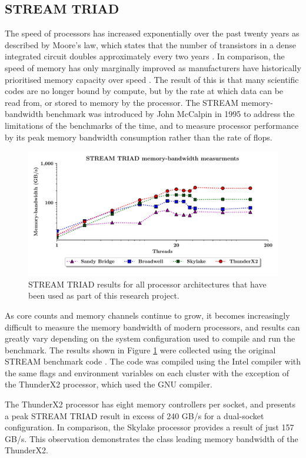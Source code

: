 \documentclass[a4paper,11pt]{report}
\begin{document}
\subsection{STREAM TRIAD}
The speed of processors has increased exponentially over the past twenty years as described by Moore's law, which states that the number of transistors in a dense integrated circuit doubles approximately every two years  \cite{moore1965cramming}. In comparison, the speed of memory has only marginally improved as manufacturers have historically prioritised memory capacity over speed \cite{mccalpin1995memory,patterson1997case}. The result of this is that many scientific codes are no longer bound by compute, but by the rate at which data can be read from, or stored to memory by the processor. The STREAM memory-bandwidth benchmark was introduced by John McCalpin in 1995 to address the limitations of the benchmarks of the time, and to measure processor performance by its peak memory bandwidth consumption rather than the rate of \gls{flops}.
\begin{figure}[htbp]
\begin{center}
\includegraphics[width=1\textwidth]{img/stream-triad.pdf}
\caption[STREAM TRIAD benchmark]{STREAM TRIAD results for all processor architectures that have been used as part of this research project. }
\label{fig:bandwidth}
\end{center}
\end{figure}
\par 
As core counts and memory channels continue to grow, it becomes increasingly difficult to measure the memory bandwidth of modern processors, and results can greatly vary depending on the system configuration used to compile and run the benchmark. The results shown in Figure \ref{fig:bandwidth} were collected using the original STREAM benchmark code \cite{stream2019github}. The code was compiled using the Intel compiler with the same flags and environment variables on each cluster with the exception of the ThunderX2 processor, which used the GNU compiler. 
\par
The ThunderX2 processor has eight memory controllers per socket, and presents a peak STREAM TRIAD result in excess of 240 GB/s for a dual-socket configuration. In comparison, the Skylake processor provides a result of just 157 GB/s. This observation demonstrates the class leading memory bandwidth of the ThunderX2.
\end{document}
